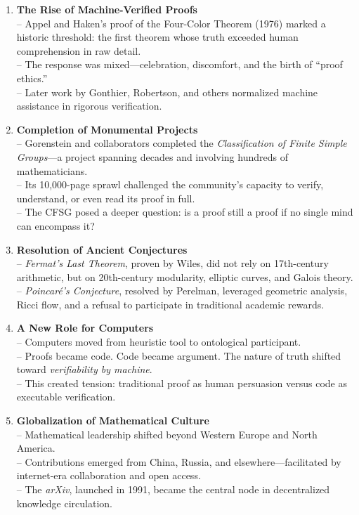 \documentclass[9pt]{article}
\begin{document}
\begin{enumerate}
  \item \textbf{The Rise of Machine-Verified Proofs} \\
  -- Appel and Haken’s proof of the Four-Color Theorem (1976) marked a historic threshold: the first theorem whose truth exceeded human comprehension in raw detail. \\
  -- The response was mixed---celebration, discomfort, and the birth of ``proof ethics.'' \\
  -- Later work by Gonthier, Robertson, and others normalized machine assistance in rigorous verification.

  \item \textbf{Completion of Monumental Projects} \\
  -- Gorenstein and collaborators completed the \textit{Classification of Finite Simple Groups}---a project spanning decades and involving hundreds of mathematicians. \\
  -- Its 10{,}000-page sprawl challenged the community’s capacity to verify, understand, or even read its proof in full. \\
  -- The CFSG posed a deeper question: is a proof still a proof if no single mind can encompass it?

  \item \textbf{Resolution of Ancient Conjectures} \\
  -- \textit{Fermat’s Last Theorem}, proven by Wiles, did not rely on 17th-century arithmetic, but on 20th-century modularity, elliptic curves, and Galois theory. \\
  -- \textit{Poincaré’s Conjecture}, resolved by Perelman, leveraged geometric analysis, Ricci flow, and a refusal to participate in traditional academic rewards.

  \item \textbf{A New Role for Computers} \\
  -- Computers moved from heuristic tool to ontological participant. \\
  -- Proofs became code. Code became argument. The nature of truth shifted toward \textit{verifiability by machine}. \\
  -- This created tension: traditional proof as human persuasion versus code as executable verification.

  \item \textbf{Globalization of Mathematical Culture} \\
  -- Mathematical leadership shifted beyond Western Europe and North America. \\
  -- Contributions emerged from China, Russia, and elsewhere---facilitated by internet-era collaboration and open access. \\
  -- The \textit{arXiv}, launched in 1991, became the central node in decentralized knowledge circulation.


\end{enumerate}
\end{document}
